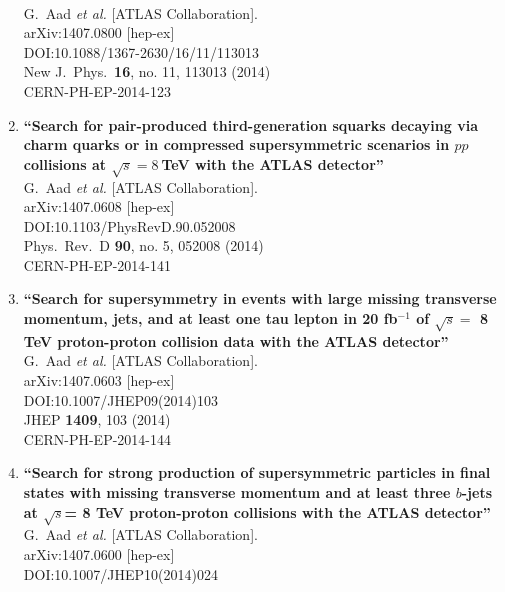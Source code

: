 \documentclass{article}
\begin{document}
\begin{enumerate}
  \\{}G.~Aad {\it et al.} [ATLAS Collaboration].
  \\{}arXiv:1407.0800 [hep-ex]
  \\{}DOI:10.1088/1367-2630/16/11/113013
  \\{}New J.\ Phys.\  {\bf 16}, no. 11, 113013 (2014)
  \\{}CERN-PH-EP-2014-123
\item%
{\bf ``Search for pair-produced third-generation squarks decaying via charm quarks or in compressed supersymmetric scenarios in $pp$ collisions at $\sqrt{s}=8~$TeV with the ATLAS detector''}
  \\{}G.~Aad {\it et al.} [ATLAS Collaboration].
  \\{}arXiv:1407.0608 [hep-ex]
  \\{}DOI:10.1103/PhysRevD.90.052008
  \\{}Phys.\ Rev.\ D {\bf 90}, no. 5, 052008 (2014)
  \\{}CERN-PH-EP-2014-141
\item%
{\bf ``Search for supersymmetry in events with large missing transverse momentum, jets, and at least one tau lepton in 20 fb$^{-1}$ of $\sqrt{s}=$ 8 TeV proton-proton collision data with the ATLAS detector''}
  \\{}G.~Aad {\it et al.} [ATLAS Collaboration].
  \\{}arXiv:1407.0603 [hep-ex]
  \\{}DOI:10.1007/JHEP09(2014)103
  \\{}JHEP {\bf 1409}, 103 (2014)
  \\{}CERN-PH-EP-2014-144
\item%
{\bf ``Search for strong production of supersymmetric particles in final states with missing transverse momentum and at least three $b$-jets at $\sqrt{s}$= 8 TeV proton-proton collisions with the ATLAS detector''}
  \\{}G.~Aad {\it et al.} [ATLAS Collaboration].
  \\{}arXiv:1407.0600 [hep-ex]
  \\{}DOI:10.1007/JHEP10(2014)024

\end{enumerate}
\end{document}
